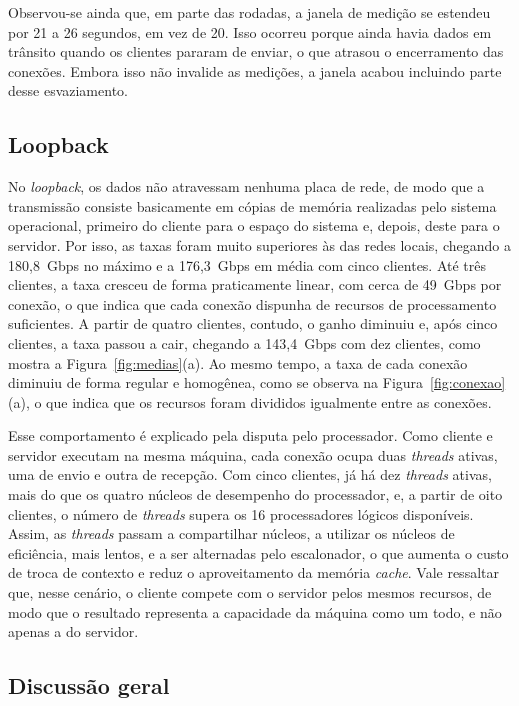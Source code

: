 \documentclass[12pt]{article}
\begin{document}
Observou-se ainda que, em parte das rodadas, a janela de medição se estendeu
por 21 a 26 segundos, em vez de 20. Isso ocorreu porque ainda havia dados em
trânsito quando os clientes pararam de enviar, o que atrasou o encerramento das
conexões. Embora isso não invalide as medições, a janela acabou incluindo parte
desse esvaziamento.

\subsection{Loopback}

No \textit{loopback}, os dados não atravessam nenhuma placa de rede, de modo
que a transmissão consiste basicamente em cópias de memória realizadas pelo
sistema operacional, primeiro do cliente para o espaço do sistema e, depois,
deste para o servidor. Por isso, as taxas foram muito superiores às das redes
locais, chegando a 180,8~Gbps no máximo e a 176,3~Gbps em média com cinco
clientes. Até três clientes, a taxa cresceu de forma praticamente linear, com
cerca de 49~Gbps por conexão, o que indica que cada conexão dispunha de
recursos de processamento suficientes. A partir de quatro clientes, contudo, o
ganho diminuiu e, após cinco clientes, a taxa passou a cair, chegando a
143,4~Gbps com dez clientes, como mostra a Figura~\ref{fig:medias}(a). Ao
mesmo tempo, a taxa de cada conexão diminuiu de forma regular e homogênea, como
se observa na Figura~\ref{fig:conexao}(a), o que indica que os recursos foram
divididos igualmente entre as conexões.

Esse comportamento é explicado pela disputa pelo processador. Como cliente e
servidor executam na mesma máquina, cada conexão ocupa duas \textit{threads}
ativas, uma de envio e outra de recepção. Com cinco clientes, já há dez
\textit{threads} ativas, mais do que os quatro núcleos de desempenho do
processador, e, a partir de oito clientes, o número de \textit{threads} supera
os 16 processadores lógicos disponíveis. Assim, as \textit{threads} passam a
compartilhar núcleos, a utilizar os núcleos de eficiência, mais lentos, e a ser
alternadas pelo escalonador, o que aumenta o custo de troca de contexto e reduz
o aproveitamento da memória \textit{cache}. Vale ressaltar que, nesse cenário,
o cliente compete com o servidor pelos mesmos recursos, de modo que o resultado
representa a capacidade da máquina como um todo, e não apenas a do servidor.

\subsection{Discussão geral}
\end{document}
